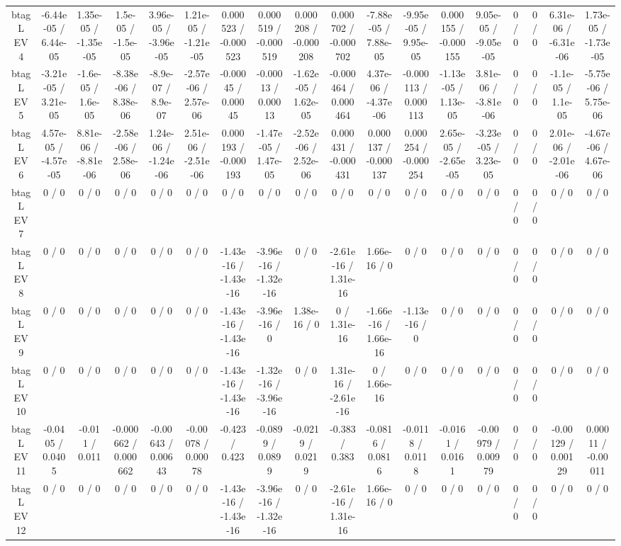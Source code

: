 \documentclass[10pt]{article}
\begin{document}
\begin{table}[htbp]
\begin{center}
\begin{tabular}{|c|c|c|c|c|c|c|c|c|c|c|c|c|c|c|c|c|c|}
  btag L EV 4 & -6.44e-05 / 6.44e-05 & 1.35e-05 / -1.35e-05 & 1.5e-05 / -1.5e-05 & 3.96e-05 / -3.96e-05 & 1.21e-05 / -1.21e-05 & 0.000523 / -0.000523 & 0.000519 / -0.000519 & 0.000208 / -0.000208 & 0.000702 / -0.000702 & -7.88e-05 / 7.88e-05 & -9.95e-05 / 9.95e-05 & 0.000155 / -0.000155 & 9.05e-05 / -9.05e-05 & 0 / 0 & 0 / 0 & 6.31e-06 / -6.31e-06 & 1.73e-05 / -1.73e-05 \\ 
  btag L EV 5 & -3.21e-05 / 3.21e-05 & -1.6e-05 / 1.6e-05 & -8.38e-06 / 8.38e-06 & -8.9e-07 / 8.9e-07 & -2.57e-06 / 2.57e-06 & -0.00045 / 0.00045 & -0.00013 / 0.00013 & -1.62e-05 / 1.62e-05 & -0.000464 / 0.000464 & 4.37e-06 / -4.37e-06 & -0.000113 / 0.000113 & -1.13e-05 / 1.13e-05 & 3.81e-06 / -3.81e-06 & 0 / 0 & 0 / 0 & -1.1e-05 / 1.1e-05 & -5.75e-06 / 5.75e-06 \\ 
  btag L EV 6 & 4.57e-05 / -4.57e-05 & 8.81e-06 / -8.81e-06 & -2.58e-06 / 2.58e-06 & 1.24e-06 / -1.24e-06 & 2.51e-06 / -2.51e-06 & 0.000193 / -0.000193 & -1.47e-05 / 1.47e-05 & -2.52e-06 / 2.52e-06 & 0.000431 / -0.000431 & 0.000137 / -0.000137 & 0.000254 / -0.000254 & 2.65e-05 / -2.65e-05 & -3.23e-05 / 3.23e-05 & 0 / 0 & 0 / 0 & 2.01e-06 / -2.01e-06 & -4.67e-06 / 4.67e-06 \\ 
  btag L EV 7 & 0 / 0 & 0 / 0 & 0 / 0 & 0 / 0 & 0 / 0 & 0 / 0 & 0 / 0 & 0 / 0 & 0 / 0 & 0 / 0 & 0 / 0 & 0 / 0 & 0 / 0 & 0 / 0 & 0 / 0 & 0 / 0 & 0 / 0 \\ 
  btag L EV 8 & 0 / 0 & 0 / 0 & 0 / 0 & 0 / 0 & 0 / 0 & -1.43e-16 / -1.43e-16 & -3.96e-16 / -1.32e-16 & 0 / 0 & -2.61e-16 / 1.31e-16 & 1.66e-16 / 0 & 0 / 0 & 0 / 0 & 0 / 0 & 0 / 0 & 0 / 0 & 0 / 0 & 0 / 0 \\ 
  btag L EV 9 & 0 / 0 & 0 / 0 & 0 / 0 & 0 / 0 & 0 / 0 & -1.43e-16 / -1.43e-16 & -3.96e-16 / 0 & 1.38e-16 / 0 & 0 / 1.31e-16 & -1.66e-16 / 1.66e-16 & -1.13e-16 / 0 & 0 / 0 & 0 / 0 & 0 / 0 & 0 / 0 & 0 / 0 & 0 / 0 \\ 
  btag L EV 10 & 0 / 0 & 0 / 0 & 0 / 0 & 0 / 0 & 0 / 0 & -1.43e-16 / -1.43e-16 & -1.32e-16 / -3.96e-16 & 0 / 0 & 1.31e-16 / -2.61e-16 & 0 / 1.66e-16 & 0 / 0 & 0 / 0 & 0 / 0 & 0 / 0 & 0 / 0 & 0 / 0 & 0 / 0 \\ 
  btag L EV 11 & -0.0405 / 0.0405 & -0.011 / 0.011 & -0.000662 / 0.000662 & -0.00643 / 0.00643 & -0.00078 / 0.00078 & -0.423 / 0.423 & -0.0899 / 0.0899 & -0.0219 / 0.0219 & -0.383 / 0.383 & -0.0816 / 0.0816 & -0.0118 / 0.0118 & -0.0161 / 0.0161 & -0.00979 / 0.00979 & 0 / 0 & 0 / 0 & -0.00129 / 0.00129 & 0.00011 / -0.00011 \\ 
  btag L EV 12 & 0 / 0 & 0 / 0 & 0 / 0 & 0 / 0 & 0 / 0 & -1.43e-16 / -1.43e-16 & -3.96e-16 / -1.32e-16 & 0 / 0 & -2.61e-16 / 1.31e-16 & 1.66e-16 / 0 & 0 / 0 & 0 / 0 & 0 / 0 & 0 / 0 & 0 / 0 & 0 / 0 & 0 / 0 \\ 

\end{tabular}
\end{center}
\end{table}
\end{document}
